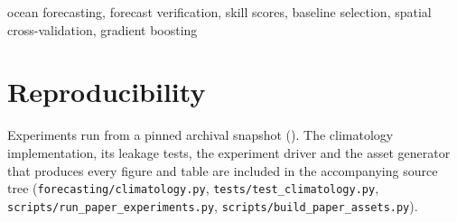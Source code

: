 \documentclass[conference]{IEEEtran}
\begin{document}
\begin{IEEEkeywords}
ocean forecasting, forecast verification, skill scores, baseline selection,
spatial cross-validation, gradient boosting
\end{IEEEkeywords}



\section*{Reproducibility}
Experiments run from a pinned archival snapshot (\AsOf{}). The climatology
implementation, its leakage tests, the experiment driver and the asset
generator that produces every figure and table are included in the
accompanying source tree (\texttt{forecasting/climatology.py},
\texttt{tests/test\_climatology.py},
\texttt{scripts/run\_paper\_experiments.py},
\texttt{scripts/build\_paper\_assets.py}).



\end{document}
